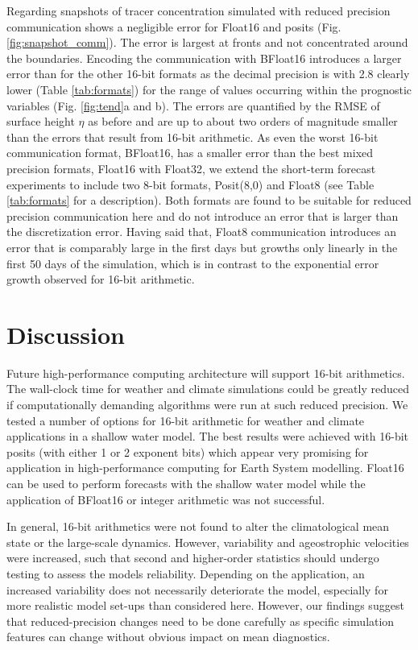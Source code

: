 Regarding snapshots of tracer concentration simulated with reduced precision
communication shows a negligible error for Float16 and posits (Fig. \ref{fig:snapshot_comm}).
The error is largest at fronts and not concentrated around the boundaries.
Encoding the communication with BFloat16 introduces a larger error than for the
other 16-bit formats as the decimal precision is with 2.8 clearly lower
(Table \ref{tab:formats}) for the range of values occurring within the prognostic
variables (Fig. \ref{fig:tend}a and b). The errors are quantified by the RMSE of
surface height $\eta$ as before and are up to about two orders of magnitude smaller
than the errors that result from 16-bit arithmetic. As even the worst 16-bit
communication format, BFloat16, has a smaller error than the best mixed precision
formats, Float16 with Float32, we extend the short-term forecast experiments to
include two 8-bit formats, Posit(8,0) and Float8 (see Table \ref{tab:formats} for
a description). Both formats are found to be suitable for reduced precision
communication here and do not introduce an error that is larger than the
discretization error. Having said that, Float8 communication introduces an error
that is comparably large in the first days but growths only linearly in the first
50 days of the simulation, which is in contrast to the exponential error growth
observed for 16-bit arithmetic.

\section{Discussion}
\label{sec:swm_discussion}

Future high-performance computing architecture will support 16-bit arithmetics. The wall-clock time for weather and
climate simulations could be greatly reduced if computationally demanding algorithms were run at such reduced precision.
We tested a number of options for 16-bit arithmetic for weather and climate applications in a shallow water model.
The best results were achieved with 16-bit posits (with either 1 or 2 exponent bits) which appear very promising for
application in high-performance computing for Earth System modelling. Float16 can be used to perform forecasts
with the shallow water model while the application of BFloat16 or integer arithmetic was not successful.

In general, 16-bit arithmetics were not found to alter the climatological mean state or the large-scale dynamics. However, 
variability and ageostrophic velocities were increased, such that second and higher-order statistics should undergo testing
to assess the models reliability. Depending on the application, an increased variability does not  necessarily deteriorate the
model, especially for more realistic model set-ups than considered here. However, our findings suggest that reduced-precision
changes need to be done carefully as specific simulation features can change without obvious impact on mean diagnostics.

